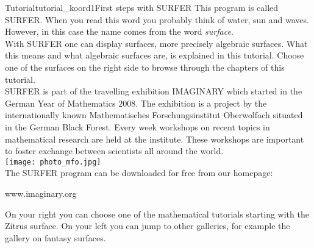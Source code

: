 \begin{surferIntroPage}{Tutorial}{tutorial_koord1}{First steps with SURFER}
This program is called SURFER. When you read this word you probably think of water, sun and waves. However, in this case the name comes from the word {\it surface}.
\\
With SURFER one can display surfaces, more precisely algebraic surfaces. What this means and what algebraic surfaces are, is explained in this tutorial. Choose one of the surfaces on the right side to browse through the chapters of this tutorial.\\
SURFER is part of the travelling exhibition IMAGINARY which started in the German Year of Mathematics 2008. The exhibition is a project by the internationally known Mathematisches Forschungsinstitut Oberwolfach situated in the German Black Forest. Every week workshops on recent topics in mathematical research are held at the institute. These workshops are important to foster exchange between scientists all around the world. \\
\vspace{0.2cm} \hspace{3.5cm}\texttt{[image: photo\_mfo.jpg]}\\
The SURFER program can be downloaded for free from our homepage: \\
\begin{centering}
www.imaginary.org\\
\end{centering}
 \vspace{0.2cm}
On your right you can choose one of the mathematical tutorials starting with the Zitrus surface. On your left you can jump to other galleries, for example the gallery on fantasy surfaces.
\end{surferIntroPage}
